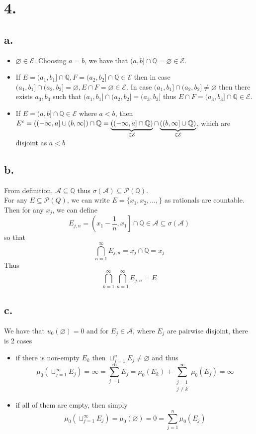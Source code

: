 \documentclass[11pt]{article}
\theoremstyle{mystyle}
\theoremstyle{definition}
\begin{document}
\section*{4.}
\subsection*{a.}
\begin{itemize}
  \item $\varnothing \in \mathcal{E}$. Choosing $a=b$, we have that $(a,b] \cap \mathbb{Q} = \varnothing \in \mathcal{E}$. 
  \item If $E = (a_1, b_1] \cap \mathbb{Q}, F = (a_2, b_2] \cap \mathbb{Q} \in \mathcal{E}$ then in case $(a_1, b_1] \cap (a_2, b_2] = \varnothing, E \cap F = \varnothing \in \mathcal{E}$. In case $(a_1, b_1] \cap (a_2, b_2] \ne \varnothing$ then there exists $a_3, b_3$ such that $(a_1, b_1] \cap (a_2, b_2] = (a_3, b_3]$ thus $E \cap F = (a_3, b_3] \cap \mathbb{Q} \in \mathcal{E}$.
  \item If $E = (a, b] \cap \mathbb{Q} \in \mathcal{E}$ where $a<b$, then $E^c = ((-\infty, a] \cup (b, \infty]) \cap \mathbb{Q}\\ = \underbrace{((-\infty, a] \cap \mathbb{Q})}_{\in \mathcal{E}} \cap \underbrace{((b, \infty] \cup \mathbb{Q})}_{\in \mathcal{E}}$, which are disjoint as $a<b$
\end{itemize}
\subsection*{b.}
From definition, $\mathcal{A} \subseteq \mathbb{Q}$ thus $\sigma(\mathcal{A}) \subseteq \mathcal{P}(\mathbb{Q})$. \\
For any $E \subseteq \mathcal{P}(Q)$, we can write $E = \{x_1, x_2, \hdots, \}$ as rationals are countable. Then for any $x_j$, we can define  
\[ 
  E_{j,n} = \left(x_1 - \displaystyle\frac{1}{n}, x_1 \right]\cap \mathbb{Q} \in \mathcal{A} \subseteq \sigma(\mathcal{A})
\]
so that 
\[
  \bigcap_{n=1}^\infty E_{j,n} = x_j \cap \mathbb{Q} = x_j 
\]
Thus 
\[
  \bigcap_{k=1}^\infty \bigcap_{n=1}^\infty E_{j,n} = E
\]
\subsection*{c.}
We have that $u_0(\varnothing) = 0$ and for $E_j \in \mathcal{A}$, where $E_j$ are pairwise disjoint, there is 2 cases
\begin{itemize}
  \item if there is non-empty $E_k$ then $\sqcup_{j=1}^n E_j \ne \varnothing$ and thus 
    \[
      \mu_0(\sqcup_{j=1}^\infty E_j ) = \infty = \sum_{j=1}^\infty E_j = \mu_0(E_k) + \sum_{\substack{j=1 \\ j \ne k}}^\infty \mu_0(E_j) = \infty 
    \]
  \item if all of them are empty, then simply
    \[
      \mu_0(\sqcup_{j=1}^\infty E_j) = \mu_0(\varnothing) = 0 = \sum_{j=1}^n \mu_0(E_j) 
    \]
\end{itemize}
\newpage
\end{document}

